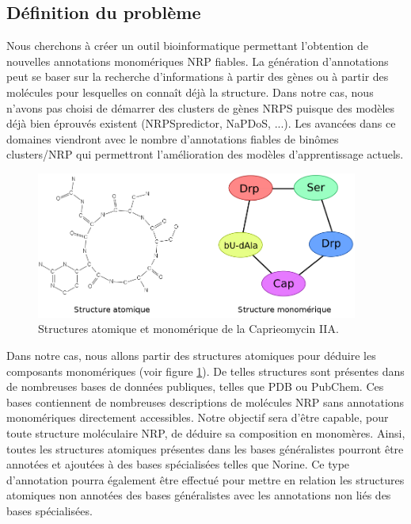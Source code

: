 \label{problems}

\subsection{Définition du problème}

Nous cherchons à créer un outil bioinformatique permettant l'obtention de nouvelles annotations monomériques NRP fiables.
La génération d'annotations peut se baser sur la recherche d'informations à partir des gènes ou à partir des molécules pour lesquelles on connaît déjà la structure.
Dans notre cas, nous n'avons pas choisi de démarrer des clusters de gènes NRPS puisque des modèles déjà bien éprouvés existent (NRPSpredictor, NaPDoS, ...).
Les avancées dans ce domaines viendront avec le nombre d'annotations fiables de binômes clusters/NRP qui permettront l'amélioration des modèles d'apprentissage actuels.

\begin{figure}[!ht]
  \begin{center}
    \includegraphics[width=400px]{Figures/s2m/Intro/structures.png}
    \caption{\label{structures}Structures atomique et monomérique de la Caprieomycin IIA.}
  \end{center}
\end{figure}

Dans notre cas, nous allons partir des structures atomiques pour déduire les composants monomériques (voir figure \ref{structures}).
De telles structures sont présentes dans de nombreuses bases de données publiques, telles que PDB ou PubChem.
Ces bases contiennent de nombreuses descriptions de molécules NRP sans annotations monomériques directement accessibles.
Notre objectif sera d'être capable, pour toute structure moléculaire NRP, de déduire sa composition en monomères.
Ainsi, toutes les structures atomiques présentes dans les bases généralistes pourront être annotées et ajoutées à des bases spécialisées telles que Norine.
Ce type d'annotation pourra également être effectué pour mettre en relation les structures atomiques non annotées des bases généralistes avec les annotations non liés des bases spécialisées.



